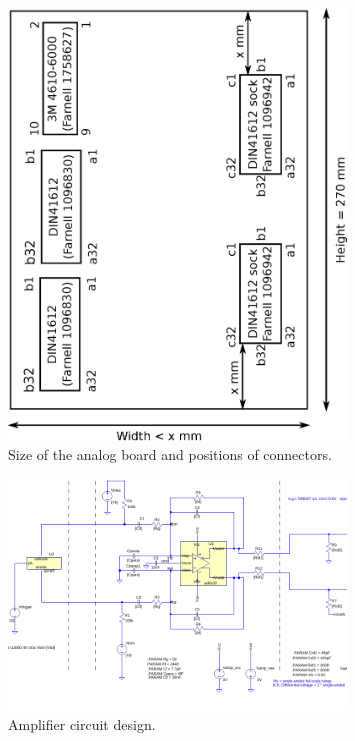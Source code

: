 \documentclass[a4paper]{article}
\begin{document}
\begin{figure}[h]
    \begin{center}
        \includegraphics[width=0.8\textwidth]{imgs/analogboardsize}
        \caption{Size of the analog board and positions of connectors.}
        \label{fig:analogboardsize}
    \end{center}
\end{figure}

\begin{figure}[h]
    \begin{center}
        \includegraphics[width=0.8\textwidth]{imgs/SiPM_test_dc_schematic}
        \caption{Amplifier circuit design.}
        \label{fig:amplifiercircuit}
    \end{center}
\end{figure}
\end{document}

